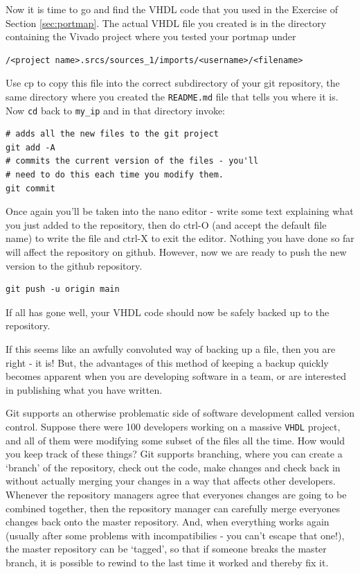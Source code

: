 \documentclass[../physical_computing.tex]{subfiles}
\begin{document}
Now it is time to go and find the VHDL code that you used in the Exercise of Section \ref{sec:portmap}. The actual VHDL file you created is in the directory containing the Vivado project where you tested your portmap under 
\begin{verbatim}
/<project name>.srcs/sources_1/imports/<username>/<filename> 
\end{verbatim}
Use cp to copy this file into the correct subdirectory of your git repository, the same directory where you created the \texttt{README.md} file that tells you where it is. Now \texttt{cd} back to \texttt{my\_ip} and in that directory invoke:
\begin{verbatim}
# adds all the new files to the git project
git add -A
# commits the current version of the files - you'll
# need to do this each time you modify them.
git commit
\end{verbatim}
Once again you'll be taken into the nano editor - write some text explaining what you just added to the repository, then do ctrl-O (and accept the default file name) to write the file and ctrl-X to exit the editor. Nothing you have done so far will affect the repository on github. However, now we are ready to push the new version to the github repository. 
\begin{verbatim}
git push -u origin main
\end{verbatim}
If all has gone well, your VHDL code should now be safely backed up to the repository. 

If this seems like an awfully convoluted way of backing up a file, then you are right - it is! But, the advantages of this method of keeping a backup quickly becomes apparent when you are developing software in a team, or are interested in publishing what you have written.

Git supports an otherwise problematic side of software development called version control. Suppose there were 100 developers working on a massive \texttt{VHDL} project, and all of them were modifying some subset of the files all the time. How would you keep track of these things? Git supports branching, where you can create a `branch' of the repository, check out the code, make changes and check back in without actually merging your changes in a way that affects other developers. Whenever the repository managers agree that everyones changes are going to be combined together, then the repository manager can carefully merge everyones changes back onto the master repository. And, when everything works again (usually after some problems with incompatibilies - you can't escape that one!), the master repository can be `tagged', so that if someone breaks the master branch, it is possible to rewind to the last time it worked and thereby fix it. 
\end{document}
